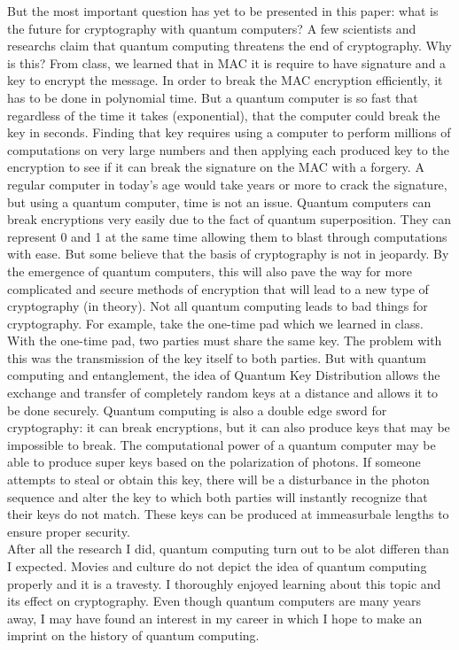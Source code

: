 \documentclass[11pt]{article}
\begin{document}
\indent But the most important question has yet to be presented in this paper: what is the future for cryptography with quantum computers? A few scientists and researchs claim that quantum computing threatens the end of cryptography. Why is this? From class, we learned that in MAC it is require to have signature and a key to encrypt the message. In order to break the MAC encryption efficiently, it has to be done in polynomial time. But a quantum computer is so fast that regardless of the time it takes (exponential), that the computer could break the key in seconds. Finding that key requires using a computer to perform millions of computations on very large numbers and then applying each produced key to the encryption to see if it can break the signature on the MAC with a forgery. A regular computer in today's age would take years or more to crack the signature, but using a quantum computer, time is not an issue. Quantum computers can break encryptions very easily due to the fact of quantum superposition. They can represent 0 and 1 at the same time allowing them to blast through computations with ease. But some believe that the basis of cryptography is not in jeopardy. By the emergence of quantum computers, this will also pave the way for more complicated and secure methods of encryption that will lead to a new type of cryptography (in theory). Not all quantum computing leads to bad things for cryptography. For example, take the one-time pad which we learned in class. With the one-time pad, two parties must share the same key. The problem with this was the transmission of the key itself to both parties. But with quantum computing and entanglement, the idea of Quantum Key Distribution allows the exchange and transfer of completely random keys at a distance and allows it to be done securely. Quantum computing is also a double edge sword for cryptography: it can break encryptions, but it can also produce keys that may be impossible to break. The computational power of a quantum computer may be able to produce super keys based on the polarization of photons. If someone attempts to steal or obtain this key, there will be a disturbance in the photon sequence and alter the key to which both parties will instantly recognize that their keys do not match. These keys can be produced at immeasurbale lengths to ensure proper security.\\
\indent After all the research I did, quantum computing turn out to be alot differen than I expected. Movies and culture do not depict the idea of quantum computing properly and it is a travesty. I thoroughly enjoyed learning about this topic and its effect on cryptography. Even though quantum computers are many years away, I may have found an interest in my career in which I hope to make an imprint on the history of quantum computing.\\
\end{document}
